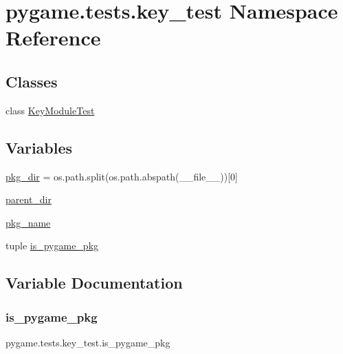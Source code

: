 \hypertarget{namespacepygame_1_1tests_1_1key__test}{}\section{pygame.\+tests.\+key\+\_\+test Namespace Reference}
\label{namespacepygame_1_1tests_1_1key__test}
\subsection*{Classes}
\begin{DoxyCompactItemize}
\item 
class \hyperlink{classpygame_1_1tests_1_1key__test_1_1_key_module_test}{Key\+Module\+Test}
\end{DoxyCompactItemize}
\subsection*{Variables}
\begin{DoxyCompactItemize}
\item 
\hyperlink{namespacepygame_1_1tests_1_1key__test_a329564ef1c7230cc98b8dead734158f2}{pkg\+\_\+dir} = os.\+path.\+split(os.\+path.\+abspath(\+\_\+\+\_\+file\+\_\+\+\_\+))\mbox{[}0\mbox{]}
\item 
\hyperlink{namespacepygame_1_1tests_1_1key__test_aa95944a9958e0c811cf2c3511010d1dd}{parent\+\_\+dir}
\item 
\hyperlink{namespacepygame_1_1tests_1_1key__test_a1f33774f2271045525acedd54140c27a}{pkg\+\_\+name}
\item 
tuple \hyperlink{namespacepygame_1_1tests_1_1key__test_a54e1ae58d8c1f1723ede5f6d693bdd68}{is\+\_\+pygame\+\_\+pkg}
\end{DoxyCompactItemize}


\subsection{Variable Documentation}
\mbox{\label{namespacepygame_1_1tests_1_1key__test_a54e1ae58d8c1f1723ede5f6d693bdd68}} 
\subsubsection{\texorpdfstring{is\+\_\+pygame\+\_\+pkg}{is\_pygame\_pkg}}
{\footnotesize\ttfamily pygame.\+tests.\+key\+\_\+test.\+is\+\_\+pygame\+\_\+pkg}

